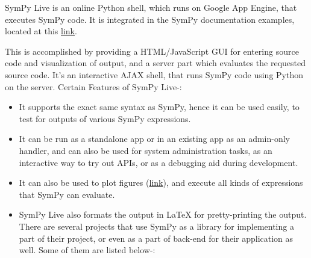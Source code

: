 SymPy Live is an online Python shell, which runs on Google
App Engine, that executes SymPy code. It is integrated in the SymPy
documentation examples, located at this \href{http://docs.sympy.org/latest/index.html}{link}.

This is accomplished by providing a HTML/JavaScript GUI for entering
source code and visualization of output, and a server part which
evaluates the requested source code. It's an interactive AJAX shell,
that runs SymPy code using Python on the server.
\newline
Certain Features of SymPy Live-:

\begin{itemize}
\item
  It supports the exact same syntax as SymPy, hence it can be used
  easily, to test for outputs of various SymPy expressions.
\item
  It can be run as a standalone app or in an existing app as an
  admin-only handler, and can also be used for system administration
  tasks, as an interactive way to try out APIs, or as a debugging aid
  during development.
\item
  It can also be used to plot figures (\href{http://live.sympy.org/?evaluate=from\%20sympy\%20import\%20symbols\%0Afrom\%20sympy.plotting\%20import\%20textplot\%0Ax\%20\%3D\%20symbols(\%27x\%27)\%0Atextplot(x**2\%2C0\%2C5)\%0A\%23--\%0A}{link}), 
  and execute all kinds of expressions that SymPy can evaluate.
\item
SymPy Live also formats the output in LaTeX for pretty-printing the
output.
There are several projects that use SymPy as a library for implementing
a part of their project, or even as a part of back-end for their 
application as well.
\newline
Some of them are listed below-:


\end{itemize}
